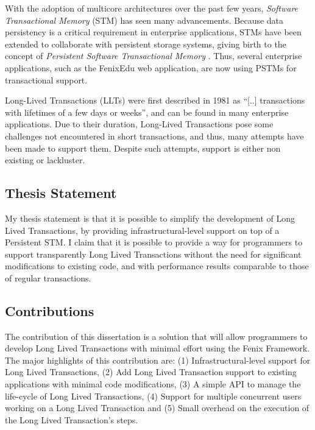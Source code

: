 \documentclass{llncs}
\begin{document}
With the adoption of multicore architectures over the past few years,
{\it Software Transactional Memory} (STM) has seen many advancements.
Because data persistency is a critical requirement in enterprise
applications, STMs have been extended to collaborate with persistent
storage systems, giving birth to the concept of {\it Persistent
  Software Transactional Memory} \cite{fernandes2011strict}. Thus,
several enterprise applications, such as the FenixEdu web application,
are now using PSTMs for transactional support.

Long-Lived Transactions (LLTs) were first described in 1981 as ``[..]
transactions with lifetimes of a few days or
weeks''\cite{gray1981transaction}, and can be found in many enterprise
applications. Due to their duration, Long-Lived Transactions pose some
challenges not encountered in short transactions, and thus, many
attempts have been made to support them. Despite such attempts,
support is either non existing or lackluster.

\subsection{Thesis Statement}

My thesis statement is that it is possible to simplify the development
of Long Lived Transactions, by providing infrastructural-level support
on top of a Persistent STM. I claim that it is possible to provide a
way for programmers to support transparently Long Lived Transactions
without the need for significant modifications to existing code, and
with performance results comparable to those of regular transactions.

\subsection{Contributions}

The contribution of this dissertation is a solution that will allow
programmers to develop Long Lived Transactions with minimal effort
using the Fenix Framework. The major highlights of this contribution
are: (1) Infrastructural-level support for Long Lived Transactions,
(2) Add Long Lived Transaction support to existing applications with
minimal code modifications, (3) A simple API to manage the life-cycle
of Long Lived Transactions, (4) Support for multiple concurrent users
working on a Long Lived Transaction and (5) Small overhead on the
execution of the Long Lived Transaction's steps.

\end{document}
